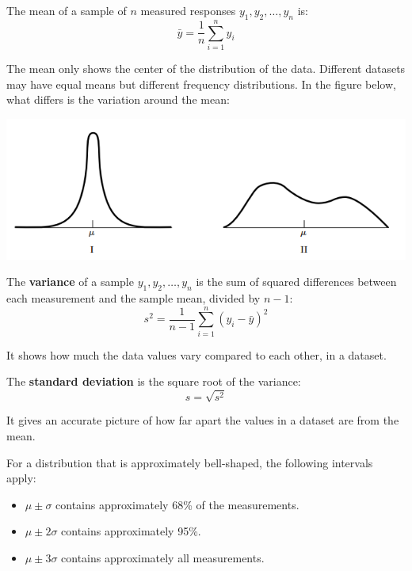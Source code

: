 \documentclass[12pt]{book}
\theoremstyle{definition}
\begin{document}
The mean of a sample of \( n \) measured responses \( y_1, y_2, \dots, y_n \) is:
\begin{equation}
    \bar{y} = \frac{1}{n} \sum_{i = 1}^{n} y_i
\end{equation}

The mean only shows the center of the distribution of the data. Different datasets may have equal means but different frequency distributions. In the figure below, what differs is the variation around the mean:
\begin{center}
    \includegraphics[scale=0.6]{./assets/distrib.png}
\end{center}

The \textbf{variance} of a sample \( y_1, y_2, \dots, y_n \) is the sum of squared differences between each measurement and the sample mean, divided by \( n - 1 \):
\begin{equation}
    s^2 = \frac{1}{n - 1} \sum_{i = 1}^{n} (y_i - \bar{y})^2
\end{equation}

It shows how much the data values vary compared to each other, in a dataset.

The \textbf{standard deviation} is the square root of the variance:
\begin{equation}
    s = \sqrt{s^2}
\end{equation}

It gives an accurate picture of how far apart the values in a dataset are from the mean.

For a distribution that is approximately bell-shaped, the following intervals apply:
\begin{itemize}
    \item \( \mu \pm \sigma \) contains approximately 68\% of the measurements.
    \item \( \mu \pm 2\sigma \) contains approximately 95\%.
    \item \( \mu \pm 3\sigma \) contains approximately all measurements.
\end{itemize}
\end{document}

